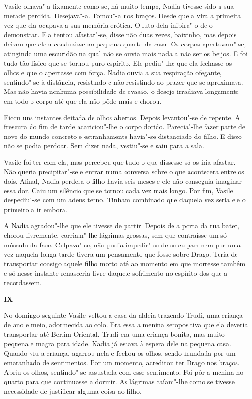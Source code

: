 Vasile olhava"-a fixamente como se, há muito tempo, Nadia tivesse sido a
sua metade perdida. Desejava"-a. Tomou"-a nos braços. Desde que a vira a
primeira vez que ela ocupava a sua memória erótica. O luto dela
inibira"-o de o demonstrar. Ela tentou afastar"-se, disse não duas vezes,
baixinho, mas depois deixou que ele a conduzisse ao pequeno quarto da
casa. Os corpos apertavam"-se, atingindo uma escuridão na qual não se
ouvia mais nada a não ser os beijos. E foi tudo tão físico que se tornou
puro espírito. Ele pediu"-lhe que ela fechasse os olhos e que o apertasse com força. Nadia ouvia a sua respiração ofegante, sentindo"-se à
distância, resistindo e não resistindo ao prazer que se aproximava. Mas
não havia nenhuma possibilidade de evasão, o desejo irradiava longamente
em todo o corpo até que ela não pôde mais e chorou.

Ficou uns instantes deitada de olhos abertos. Depois levantou"-se de
repente. A frescura do fim de tarde acariciou"-lhe o corpo dorido.
Parecia"-lhe fazer parte de novo do mundo concreto e estranhamente
havia"-se distanciado do filho. E disso não se podia perdoar. Sem dizer
nada, vestiu"-se e saiu para a sala.

Vasile foi ter com ela, mas percebeu que tudo o que dissesse só os iria
afastar. Não queria precipitar"-se e entrar numa conversa sobre o que
acontecera entre os dois. Afinal, Nadia perdera o filho havia seis
meses e ele não conseguia imaginar essa dor. Caiu um silêncio que se
tornou cada vez mais longo. Por fim, Vasile despediu"-se com um adeus
terno. Tinham combinado que daquela vez seria ele o primeiro a ir
embora.

A Nadia agradou"-lhe que ele tivesse de partir. Depois de a porta da rua
bater, chorou livremente, corriam"-lhe lágrimas grossas, sem que
contraísse um só músculo da face. Culpava"-se, não podia impedir"-se de se
culpar: nem por uma vez naquela longa tarde tivera um pensamento que
fosse sobre Drago. Teria de transportar consigo aquele filho morto até
ao momento em que morresse também e só nesse instante renasceria livre
daquele sofrimento no espírito dos que a recordassem.


\pagebreak
\vspace*{1.8cm}
\noindent{}\textbf{IX}

\bigskip

No domingo seguinte Vasile voltou à casa da aldeia trazendo Trudi, uma
criança de ano e meio, adormecida ao colo. Era essa a menina
seropositiva que ela deveria transportar até Berlim Oriental. Trudi
era uma criança bonita, mas muito pequena e magra para idade. Nadia já
estava à espera dele na pequena casa. Quando viu a criança, agarrou
nela e fechou os olhos, sendo inundada por um emaranhado de
sentimentos. Por um momento, acreditou ter Drago nos braços. Abriu os
olhos, sentindo"-se assustada com esse sentimento. Foi pôr a menina no
quarto para que continuasse a dormir. As lágrimas caíam"-lhe como se
tivesse necessidade de justificar alguma coisa ao filho.


